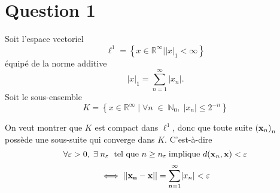 \documentclass[letterpaper,12pt,oneside,final]{book}
\begin{document}



\newcommand\monPrenom{Frédéric}		%
\newcommand\monNom{Lague}			%
\newcommand\monMatricule{186131}	%
\newcommand\monGroupe{01}		%






\section*{Question 1}
Soit l'espace vectoriel
\[
\ell^{1} = \left\{ x\in \mathbb{R}^{\infty} | \lvert x \rvert _{1} < \infty  \right\} 
\]
équipé de la norme additive 
\[
\lvert x \rvert _{1} = \sum_{n=1}^{\infty} | x_{n}|.
\]
Soit le sous-ensemble
\begin{equation}\label{setk}
K = \left\{ x\in \mathbb{R}^{\infty}\;\vert\; \forall n\; \in \; \mathbb{N}_{0}, \;|x_{n}| \leq 2^{-n}\right\}
\end{equation}

On veut montrer que $K$ est compact dans \(    \ell^{1}    \), donc que toute suite \(    \left( \vb{x}_{n} \right)_{n}   \) 
possède une sous-suite qui converge dans \(    K   \). C'est-à-dire
\[
\forall \varepsilon > 0,\;\exists\;n_{\varepsilon}\;\text{ tel que } n\geq  n_{\varepsilon}\;\text{implique }
d(\vb{x}_{n},\vb{x}) < \varepsilon 
\]
\[
\iff \lvert\lvert \vb{x_{n}}-\vb{x} \rvert\rvert = \sum_{n=1}^{\infty} \lvert x_{n} \rvert < \varepsilon 
\]
\end{document}
